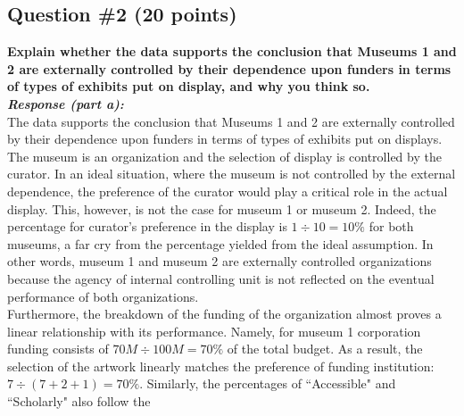 \documentclass[12pt]{article}
\newcommand\tab[1][1cm]{\hspace*{#1}}
\begin{document}
\subsection*{Question \#2 (20 points)}
\textbf{Explain whether the data supports the conclusion that Museums 1 and 2 are externally controlled by their dependence upon funders in terms of types of exhibits put on display, and why you think so.}\\
\textbf{\emph{Response (part a): }} \\
\tab The data supports the conclusion that Museums 1 and 2 are externally controlled by their dependence upon funders in terms of types of exhibits put on displays. \\
\tab The museum is an organization and the selection of display is controlled by the curator. In an ideal situation, where the museum is not controlled by the external dependence, the preference of the curator would play a critical role in the actual display. This, however, is not the case for museum 1 or museum 2. Indeed, the percentage for curator's preference in the display is $1 \div 10 = 10\%$ for both museums, a far cry from the percentage yielded from the ideal assumption. In other words, museum 1 and museum 2 are externally controlled organizations because the agency of internal controlling unit is not reflected on the eventual performance of both organizations. \\
\tab Furthermore, the breakdown of the funding of the organization almost proves a linear relationship with its performance. Namely, for museum 1 corporation funding consists of $70M \div 100M = 70\%$ of the total budget. As a result, the selection of the artwork linearly matches the preference of funding institution: $7 \div (7+2+1) = 70\%$. Similarly, the percentages of ``Accessible" and ``Scholarly" also follow the 
\end{document}
